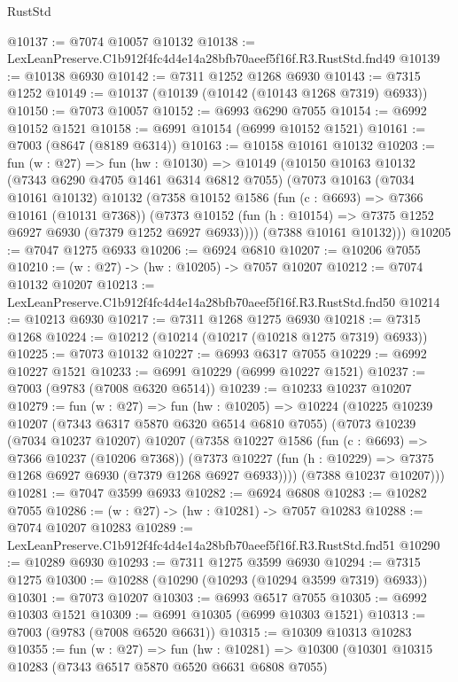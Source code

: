 \begin{lexlean}{RustStd}
\begin{coremodule}
@10137 := @7074 @10057 @10132
@10138 := LexLeanPreserve.C1b912f4fc4d4e14a28bfb70aeef5f16f.R3.RustStd.fnd49
@10139 := @10138 @6930
@10142 := @7311 @1252 @1268 @6930
@10143 := @7315 @1252
@10149 := @10137 (@10139 (@10142 (@10143 @1268 @7319) @6933))
@10150 := @7073 @10057
@10152 := @6993 @6290 @7055
@10154 := @6992 @10152 @1521
@10158 := @6991 @10154 (@6999 @10152 @1521)
@10161 := @7003 (@8647 (@8189 @6314))
@10163 := @10158 @10161 @10132
@10203 := fun (w : @27) =>
  fun (hw : @10130) =>
  @10149
    (@10150
      @10163
      @10132
      (@7343 @6290 @4705 @1461 @6314 @6812 @7055)
      (@7073
        @10163
        (@7034 @10161 @10132)
        @10132
        (@7358
          @10152
          @1586
          (fun (c : @6693) => @7366 @10161 (@10131 @7368))
          (@7373 @10152 (fun (h : @10154) => @7375 @1252 @6927 @6930 (@7379 @1252 @6927 @6933))))
        (@7388 @10161 @10132)))
@10205 := @7047 @1275 @6933
@10206 := @6924 @6810
@10207 := @10206 @7055
@10210 := (w : @27) -> (hw : @10205) -> @7057 @10207
@10212 := @7074 @10132 @10207
@10213 := LexLeanPreserve.C1b912f4fc4d4e14a28bfb70aeef5f16f.R3.RustStd.fnd50
@10214 := @10213 @6930
@10217 := @7311 @1268 @1275 @6930
@10218 := @7315 @1268
@10224 := @10212 (@10214 (@10217 (@10218 @1275 @7319) @6933))
@10225 := @7073 @10132
@10227 := @6993 @6317 @7055
@10229 := @6992 @10227 @1521
@10233 := @6991 @10229 (@6999 @10227 @1521)
@10237 := @7003 (@9783 (@7008 @6320 @6514))
@10239 := @10233 @10237 @10207
@10279 := fun (w : @27) =>
  fun (hw : @10205) =>
  @10224
    (@10225
      @10239
      @10207
      (@7343 @6317 @5870 @6320 @6514 @6810 @7055)
      (@7073
        @10239
        (@7034 @10237 @10207)
        @10207
        (@7358
          @10227
          @1586
          (fun (c : @6693) => @7366 @10237 (@10206 @7368))
          (@7373 @10227 (fun (h : @10229) => @7375 @1268 @6927 @6930 (@7379 @1268 @6927 @6933))))
        (@7388 @10237 @10207)))
@10281 := @7047 @3599 @6933
@10282 := @6924 @6808
@10283 := @10282 @7055
@10286 := (w : @27) -> (hw : @10281) -> @7057 @10283
@10288 := @7074 @10207 @10283
@10289 := LexLeanPreserve.C1b912f4fc4d4e14a28bfb70aeef5f16f.R3.RustStd.fnd51
@10290 := @10289 @6930
@10293 := @7311 @1275 @3599 @6930
@10294 := @7315 @1275
@10300 := @10288 (@10290 (@10293 (@10294 @3599 @7319) @6933))
@10301 := @7073 @10207
@10303 := @6993 @6517 @7055
@10305 := @6992 @10303 @1521
@10309 := @6991 @10305 (@6999 @10303 @1521)
@10313 := @7003 (@9783 (@7008 @6520 @6631))
@10315 := @10309 @10313 @10283
@10355 := fun (w : @27) =>
  fun (hw : @10281) =>
  @10300
    (@10301
      @10315
      @10283
      (@7343 @6517 @5870 @6520 @6631 @6808 @7055)

\end{coremodule}
\end{lexlean}
